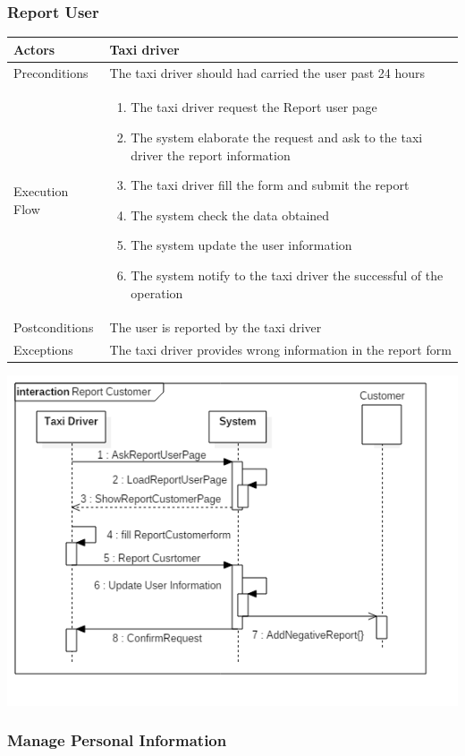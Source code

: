 \documentclass[english]{article}
\providecommand{\tabularnewline}{\\}
\begin{document}
\subsubsection{Report User}

\begin{tabular}{lp{8cm}}
\hline 
Actors  & Taxi driver \tabularnewline
\hline 
Preconditions  & The taxi driver should had carried the user past 24 hours \tabularnewline
\hline 
Execution Flow  & \begin{enumerate}
\item The taxi driver request the Report user page 
\item The system elaborate the request and ask to the taxi driver the report
information 
\item The taxi driver fill the form and submit the report 
\item The system check the data obtained 
\item The system update the user information 
\item The system notify to the taxi driver the successful of the operation \end{enumerate}
\tabularnewline
\hline 
Postconditions  & The user is reported by the taxi driver \tabularnewline
\hline 
Exceptions  & The taxi driver provides wrong information in the report form \tabularnewline
\end{tabular}

\includegraphics[width=\textwidth]{ReportUser}


\subsubsection{Manage Personal Information}
\end{document}
